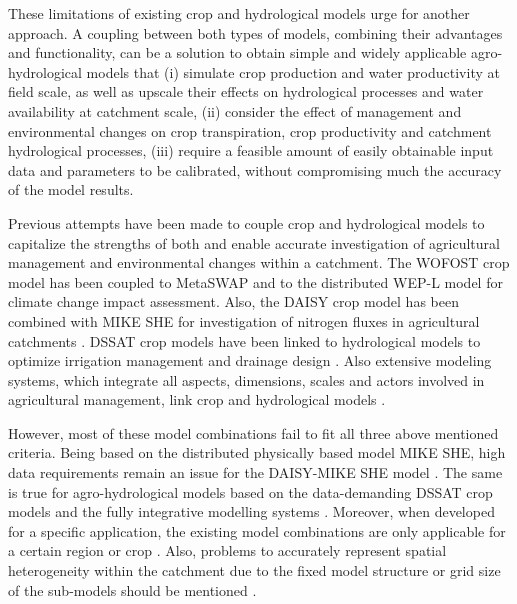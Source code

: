 These limitations of existing crop and hydrological models urge for another approach. A coupling between both types of models, combining their advantages and functionality, can be a solution to obtain simple and widely applicable agro-hydrological models that (i) simulate crop production and water productivity at field scale, as well as upscale their effects on hydrological processes and water availability at catchment scale, (ii) consider the effect of management and environmental changes on crop transpiration, crop productivity and catchment hydrological processes, (iii) require a feasible amount of easily obtainable input data and parameters to be calibrated, without compromising much the accuracy of the model results.

Previous attempts have been made to couple crop and hydrological models to capitalize the strengths of both and enable accurate investigation of agricultural management and environmental changes within a catchment. The WOFOST crop model \parencite{boogaard2014} has been coupled to MetaSWAP \parencite{vanwalsum2012} and to the distributed WEP-L model \parencite{jia2011} for climate change impact assessment. Also, the DAISY crop model \parencite{abrahamsen2000} has been combined with MIKE SHE for investigation of nitrogen fluxes in agricultural catchments \parencite{styczen1993, thorsen2001}. DSSAT crop models \parencite{jones2003} have been linked to hydrological models to optimize irrigation management and drainage design \parencite{mcnider2014, singh2008}. Also extensive modeling systems, which integrate all aspects, dimensions, scales and actors involved in agricultural management, link crop and hydrological models \parencite{jakeman2003, letcher2006}. 

However, most of these model combinations fail to fit all three above mentioned criteria. Being based on the distributed physically based model MIKE SHE, high data requirements remain an issue for the DAISY-MIKE SHE model \parencite{boegh2004, thorsen2001}. The same is true for agro-hydrological models based on the data-demanding DSSAT crop models \parencite{jones2003} and the fully integrative modelling systems \parencite{jakeman2003}. Moreover, when developed for a specific application, the existing model combinations are only applicable for a certain region or crop \parencite{mcnider2014}. Also, problems to accurately represent spatial heterogeneity within the catchment due to the fixed model structure or grid size of the sub-models should be mentioned \parencite{bithell2009, thorsen2001}.

